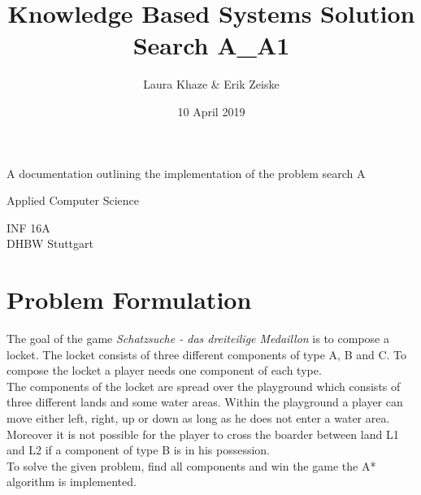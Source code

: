 \documentclass{article}
\title{Knowledge Based Systems Solution Search A\_A1}
\author{Laura Khaze \& Erik Zeiske}
\date{10 April 2019}
\begin{document}
\begin{titlepage}
    \begin{center}
        \vspace*{1cm}
 
        \Huge
        \textbf{\@title}
 
        \vspace{0.5cm}
        \LARGE
        A documentation outlining the implementation of the problem search A
 
        \vspace{1.5cm}
 
        \textbf{\@author}
 
        \vfill
 
        Applied Computer Science
 
 
        INF 16A\\
        DHBW Stuttgart\\
        \@date
 
    \end{center}
\end{titlepage}
\tableofcontents
\newpage
\section{Problem Formulation}
The goal of the game \textit{Schatzsuche - das dreiteilige Medaillon} is to compose a locket. The locket consists of three different components of type A, B and C. To compose the locket a player needs one component of each type. \\
The components of the locket are spread over the playground which consists of three different lands and some water areas. Within the playground a player can move either left, right, up or down as long as he does not enter a water area. Moreover it is not possible for the player to cross the boarder between land L1 and L2 if a component of type B is in his possession. \\
To solve the given problem, find all components and win the game the A* algorithm is implemented. \\
\end{document}
